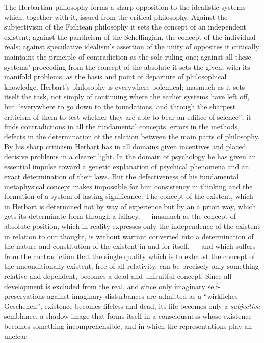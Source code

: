 The Herbartian philosophy forms a sharp opposition to the idealistic
systems which, together with it, issued from the critical philosophy.
Against the subjectivism of the Fichtean philosophy it sets
the concept of an independent existent; against the pantheism of the
Schellingian, the concept of the individual reals; against speculative
idealism's assertion of the unity of opposites it critically maintains
the principle of contradiction as the sole ruling one; against all
these systems' proceeding from the concept of the absolute it sets the
given, with its manifold problems, as the basis and point of departure
of philosophical knowledge. Herbart's philosophy is everywhere
polemical; inasmuch as it sets itself the task, not simply of
continuing where the earlier systems have left off, but ``everywhere to
go down to the foundations, and through the sharpest criticism of them
to test whether they are able to bear an edifice of science'', it finds
contradictions in all the fundamental concepts, errors in the methods,
defects in the determination of the relation between the main parts of
philosophy. By his sharp criticism Herbart has in all domains given
incentives and placed decisive problems in a clearer light. In the
domain of psychology he has given an essential impulse toward a genetic
explanation of psychical phenomena and an exact determination of their
laws. But the defectiveness of his fundamental metaphysical concept
makes impossible for him consistency in thinking and the formation of a
system of lasting significance. The concept of the existent, which in
Herbart is determined not by way of experience but by an a priori way,
which gets its determinate form through a fallacy, --- inasmuch as the
concept of absolute position, which in reality expresses only the
independence of the existent in relation to our thought, is without
warrant converted into a determination of the nature and constitution
of the existent in and for itself, --- and which suffers from the
contradiction that the single quality which is to exhaust the concept
of the unconditionally existent, free of all relativity, can be
precisely only something relative and dependent, becomes a dead and
unfruitful concept. Since all development is excluded from the real,
and since only imaginary self-preservations against imaginary
disturbances are admitted as a ``wirkliches Geschehen'', existence
becomes lifeless and dead,
its life becomes only a \emph{subjective} semblance, a shadow-image
that forms itself in a consciousness whose existence becomes something
incomprehensible, and in which the representations play an unclear
